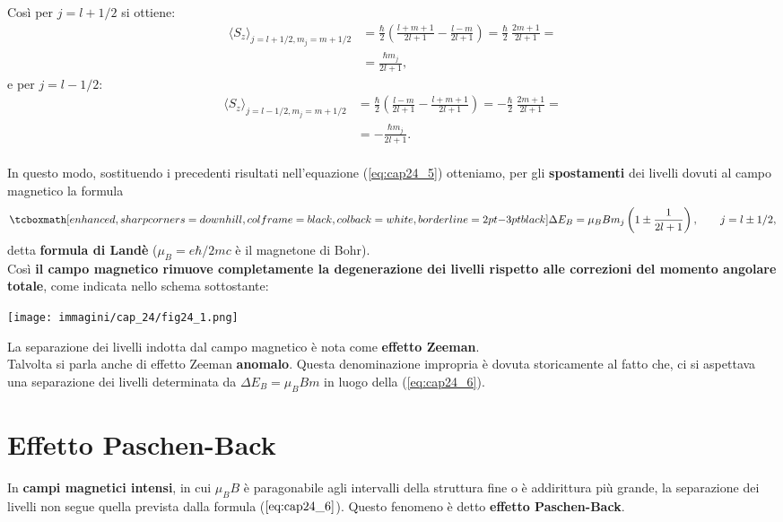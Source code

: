 \documentclass[a4paper,12pt,oneside]{book}
\begin{document}
Così per $j=l+1/2$ si ottiene:
	\begin{align}
		\langle S_z \rangle_{j=l+1/2,m_j=m+1/2} & = \frac{\hbar}{2} \left( \frac{l+m+1}{2l+1}-\frac{l-m}{2l+1} \right)=\frac{\hbar}{2} \ \frac{2m+1}{2l+1}=  \nonumber \\
		& = \frac{\hbar m_j}{2l+1} ,
	\end{align}
e per $j=l-1/2$:
	\begin{align}
		\langle S_z \rangle_{j=l-1/2,m_j=m+1/2} & = \frac{\hbar}{2} \left( \frac{l-m}{2l+1}-\frac{l+m+1}{2l+1} \right)=-\frac{\hbar}{2} \ \frac{2m+1}{2l+1}=  \nonumber \\
		& = -\frac{\hbar m_j}{2l+1} .
	\end{align}\\

In questo modo, sostituendo i precedenti risultati nell'equazione (\ref{eq:cap24_5}) otteniamo, per gli \textbf{spostamenti} dei livelli dovuti al campo magnetico la formula
	\begin{equation}
	\label{eq:cap24_6}
		\tcboxmath[enhanced, sharp corners=downhill, colframe=black, colback=white, borderline={2pt}{-3pt}{black}]{
			\Delta E_B= \mu_B B m_j \left( 1\pm \frac{1}{2l+1}\right), \qquad j=l\pm 1/2 ,
			}
	\end{equation}
detta \textbf{formula di Landè} ($\mu_B=e\hbar /2mc$ è il magnetone di Bohr).\\

Così \textbf{il campo magnetico rimuove completamente la degenerazione dei livelli rispetto alle correzioni del momento angolare totale}, come indicata nello schema sottostante: 
\begin{center}
\begin{tcolorbox}[sharp corners=downhill, width=.9\textwidth, colframe=black, colback=white]
\texttt{[image: immagini/cap\_24/fig24\_1.png]}
\end{tcolorbox}
\end{center}

La separazione dei livelli indotta dal campo magnetico è nota come \textbf{effetto Zeeman}. \\

Talvolta si parla anche di effetto Zeeman \textbf{anomalo}. Questa denominazione impropria è dovuta storicamente al fatto che, ci si aspettava una separazione dei livelli determinata da $\Delta E_B=\mu_BBm$ in luogo della (\ref{eq:cap24_6}).

\section{Effetto Paschen-Back}
In \textbf{campi magnetici intensi}, in cui $\mu_B B$ è paragonabile agli intervalli della struttura fine o è addirittura più grande, la separazione dei livelli non segue quella prevista dalla formula ($\ref{eq:cap24_6}$). Questo fenomeno è detto \textbf{effetto Paschen-Back}. \\
\end{document}
